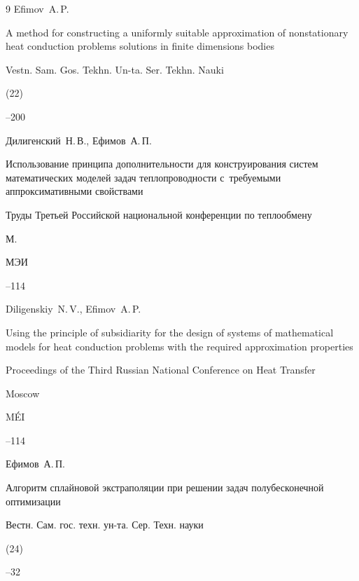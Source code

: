 \begin{thebibliography}{9}
\by Efimov~A.\,P.

\paper A method for constructing a uniformly suitable approximation of  nonstationary heat conduction problems solutions in finite dimensions bodies

\jour Vestn. Sam. Gos. Tekhn. Un-ta. Ser. Tekhn. Nauki

(22)


--200






\by Дилигенский~Н.\,В., Ефимов~А.\,П.

\paper Использование принципа дополнительности для конструирования систем математических моделей задач теплопроводности с~требуемыми аппроксимативными свойствами

\inbook Труды Третьей Российской национальной конференции по теплообмену


\publaddr М.

\publ МЭИ


--114

\misctransl

\by Diligenskiy~N.\,V., Efimov~A.\,P.

\paper Using the principle of subsidiarity for the design of systems of mathematical models for heat conduction problems with the required approximation properties

\inbook Proceedings of the Third Russian National Conference on Heat Transfer


\publaddr Moscow

\publ M\'EI


--114




\by Ефимов~А.\,П.

\paper Алгоритм сплайновой экстраполяции при решении задач полубесконечной оптимизации

\jour Вестн. Сам. гос. техн. ун-та. Сер. Техн. науки

(24)


--32

\misctransl


\end{thebibliography}
